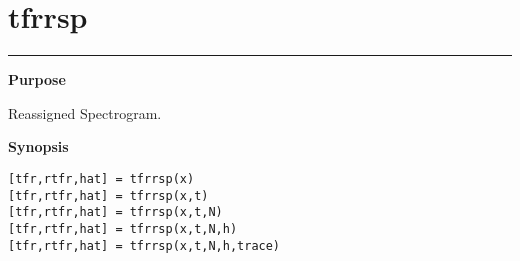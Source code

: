 

\section*{\hspace*{-1.6cm} tfrrsp}

\vspace*{-.4cm}
\hspace*{-1.6cm}\rule[0in]{16.5cm}{.02cm}
\vspace*{.2cm}

{\bf \large \sf Purpose}\\
\hspace*{1.5cm}
\begin{minipage}[t]{13.5cm}
Reassigned Spectrogram.
\end{minipage}
\vspace*{.5cm}

{\bf \large \sf Synopsis}\\
\hspace*{1.5cm}
\begin{minipage}[t]{13.5cm}
\begin{verbatim}
[tfr,rtfr,hat] = tfrrsp(x) 
[tfr,rtfr,hat] = tfrrsp(x,t) 
[tfr,rtfr,hat] = tfrrsp(x,t,N) 
[tfr,rtfr,hat] = tfrrsp(x,t,N,h) 
[tfr,rtfr,hat] = tfrrsp(x,t,N,h,trace) 
\end{verbatim}
\end{minipage}
\vspace*{.5cm}

